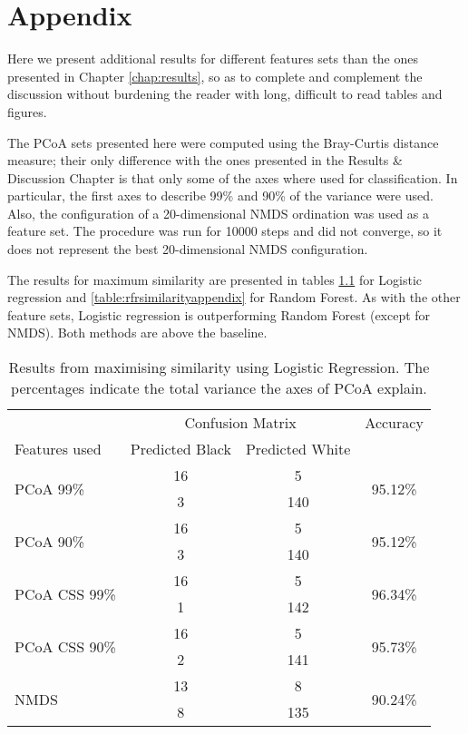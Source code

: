 \chapter{Appendix} 

Here we present additional results for different features sets than the ones presented in Chapter \ref{chap:results}, so as to complete and complement the discussion without burdening the reader with long, difficult to read tables and figures.

The PCoA sets presented here were computed using the Bray-Curtis distance measure; their only difference with the ones presented in the Results \& Discussion Chapter is that only some of the axes where used for classification. In particular, the first axes to describe 99\% and 90\% of the variance were used. Also, the configuration of a 20-dimensional NMDS ordination was used as a feature set. The procedure was run for 10000 steps and did not converge, so it does not represent the best 20-dimensional NMDS configuration.


The results for maximum similarity are presented in tables \ref{table:lrsimilarityappendix} for Logistic regression and \ref{table:rfrsimilarityappendix} for Random Forest. As with the other feature sets, Logistic regression is outperforming Random Forest (except for NMDS). Both methods are above the baseline.
\begin{table}[h]
	\centering
	\begin{tabular}{l c  c c}
		\toprule
		&\multicolumn{2}{c}{Confusion Matrix} & Accuracy\\
		Features used & Predicted Black&Predicted White&\\
		\midrule
		\multirow{2}{*}{PCoA 99\%} &16 &5&\multirow{2}{*}{95.12\%}\\
		&	 3&140&\\
		\cmidrule{2-3}
		\multirow{2}{*}{PCoA 90\%} &16 &5&\multirow{2}{*}{95.12\%}\\
		&	 3&140&\\
		\cmidrule{2-3}
		\multirow{2}{*}{PCoA CSS 99\%} &16 &5&\multirow{2}{*}{96.34\%}\\
		&	 1&142&\\
		\cmidrule{2-3}
		\multirow{2}{*}{PCoA CSS 90\%} &16 &5&\multirow{2}{*}{95.73\%}\\
		&	 2&141&\\
		\cmidrule{2-3}
		\multirow{2}{*}{NMDS}&13 &8&\multirow{2}{*}{90.24\%}\\
		&	 8&135&\\
		\bottomrule
	\end{tabular}
	\caption{Results from maximising similarity using Logistic Regression. The percentages indicate the total variance the axes of PCoA explain.}
	\label{table:lrsimilarityappendix}
\end{table}

